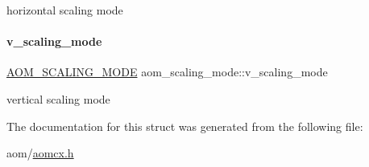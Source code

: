 horizontal scaling mode \mbox{\label{structaom__scaling__mode_a3b535e8839e2bdf05afcd15ec6daa6ce}} 
\paragraph{\texorpdfstring{v\+\_\+scaling\+\_\+mode}{v\_scaling\_mode}}
{\footnotesize\ttfamily \hyperlink{group__aom__encoder_ga6694eedd50b128415a3434404c56d73d}{A\+O\+M\+\_\+\+S\+C\+A\+L\+I\+N\+G\+\_\+\+M\+O\+DE} aom\+\_\+scaling\+\_\+mode\+::v\+\_\+scaling\+\_\+mode}

vertical scaling mode 

The documentation for this struct was generated from the following file\+:\begin{DoxyCompactItemize}
\item 
aom/\hyperlink{aomcx_8h}{aomcx.\+h}\end{DoxyCompactItemize}
